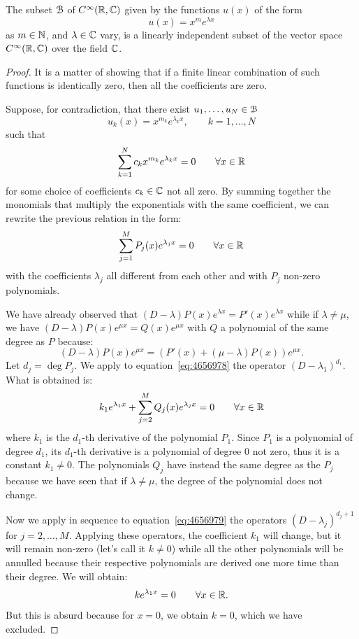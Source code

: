 \begin{theorem}
\mymark{***}
The subset $\mathcal B$ of $C^\infty({\mathbb R}, {\mathbb C})$ given by the functions $u(x)$ of the
form
\[
   u(x) = x^m e^{\lambda x}
\]
as $m\in {\mathbb N}$, and $\lambda \in {\mathbb C}$ vary, is a linearly independent subset
of the vector space $C^\infty({\mathbb R},{\mathbb C})$ over the field ${\mathbb C}$.
\end{theorem}
%
\begin{proof}
It is a matter of showing that if a finite linear combination of such functions
is identically zero, then all the coefficients are zero.

Suppose, for contradiction, that there exist
$u_1, \dots, u_N\in \mathcal B$
\[
  u_k(x) = x^{m_k} e^{\lambda_k x}, \qquad k=1, \dots, N
\]
such that
\[
\sum_{k=1}^N c_k x^{m_k} e^{\lambda_k x} = 0
  \qquad \forall x \in {\mathbb R}
\]
for some choice of coefficients $c_k \in {\mathbb C}$ not all zero.
By summing together the monomials that multiply the exponentials with the same
coefficient, we can rewrite the previous relation in the form:
\begin{equation}\label{eq:4656978}
  \sum_{j=1}^M P_j(x) e^{\lambda_j x} = 0 \qquad \forall x\in {\mathbb R}
\end{equation}
with the coefficients $\lambda_j$ all different from each other and with
$P_j$ non-zero polynomials.

We have already observed that $(D-\lambda)P(x)e^{\lambda x}= P'(x)e^{\lambda x}$
while if $\lambda\neq \mu$, we have $(D-\lambda)P(x) e^{\mu x} = Q(x) e^{\mu x}$
with $Q$ a polynomial of the same degree as $P$ because:
\[
(D-\lambda) P(x) e^{\mu x} = (P'(x) + (\mu-\lambda) P(x)) e^{\mu x}.  
\]
Let $d_j = \deg P_j$. We apply to equation~\eqref{eq:4656978}
the operator $(D-\lambda_1)^{d_1}$.
What is obtained is:
\begin{equation}\label{eq:4656979}
    k_1 e^{\lambda_1 x} + \sum_{j=2}^M Q_j(x) e^{\lambda_j x} = 0 \qquad \forall
  x\in {\mathbb R}
\end{equation}
where $k_1$ is the $d_1$-th derivative of the polynomial $P_1$.
Since $P_1$ is a polynomial of degree $d_1$, its
$d_1$-th derivative is a polynomial of degree $0$ not zero,
thus it is a constant $k_1 \neq 0$.
The polynomials $Q_j$ have instead the same degree as the $P_j$ because we have
seen
that if $\lambda\neq \mu$, the degree of the polynomial does not change.

Now we apply in sequence to equation~\eqref{eq:4656979} the operators
$(D-\lambda_j)^{d_j+1}$ for $j=2,\dots, M$.
Applying these operators, the coefficient $k_1$ will change, but it will remain
non-zero (let's call it $k\neq 0$) while all the other polynomials
will be annulled because their respective polynomials are derived one more time
than
their degree. We will obtain:
\[
  k e^{\lambda_1 x} = 0 \qquad \forall x\in {\mathbb R}.
\]
But this is absurd because for $x=0$, we obtain $k=0$, which we have excluded.
\end{proof}

